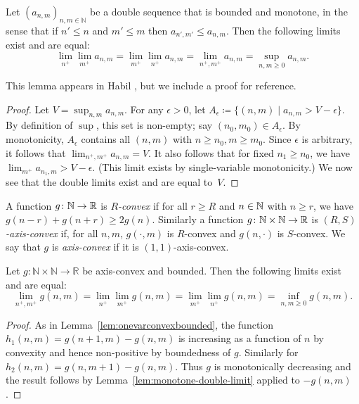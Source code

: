   \begin{lemma}\label{lem:monotone-double-limit}
  Let $(a_{n,m})_{n,m \in \mathbb{N}}$ be a double sequence that is
  bounded and monotone, in the sense that if $n' \leq n$ and
  $m' \leq m$ then
  $a_{n',m'} \leq a_{n,m}$. Then the following limits
  exist and are equal:
  \[
  \lim_{n^+}\lim_{m^+} a_{n,m} = \lim_{m^+}\lim_{n^+} a_{n,m} =
    \lim_{n^+, m^+} a_{n,m} = \sup_{n,m \ge 0} a_{n,m}.
  \]
  \end{lemma}
This lemma appears in Habil \cite[Thm.\ 4.2]{Hab16:DoubleSeq}, but we
include a proof for reference.

  \begin{proof}
    Let $V = \sup_{n,m} a_{n,m}$. For any $\epsilon > 0$, let
    $A_\epsilon \coloneqq \{(n,m) \mid a_{n,m} > V - \epsilon\}$. By
    definition of $\sup$, this set is non-empty; say $(n_0,m_0) \in
    A_\epsilon$. By monotonicity, $A_\epsilon$ contains all $(n,m)$
    with $n\ge n_0, m \ge m_0$. Since $\epsilon$ is arbitrary, it
    follows that $\lim_{n^+,m^+} a_{n,m} = V$. It also follows that
    for fixed $n_1 \ge n_0$, we have $\lim_{m^+} a_{n_1,m} >
    V-\epsilon$. (This limit
    exists by single-variable monotonicity.) We now see that the
    double limits exist and are equal to~$V$.
  \end{proof}

\begin{definition}
  A function $g \colon \mathbb{N} \to \mathbb{R}$ is \emph{$R$-convex} if for all
  $r \ge R$ and $n \in \mathbb{N}$ with $n \ge r$, we have
  $g(n-r) + g(n+r) \geq 2 g(n)$. Similarly a function
  $g \colon \mathbb{N} \times \mathbb{N} \to \mathbb{R}$ is
  \emph{$(R,S)$-axis-convex} if, for all $n,m$, $g(\cdot, m)$ is
  $R$-convex and $g(n, \cdot)$ is $S$-convex. We say that $g$ is
  \emph{axis-convex} if it is $(1,1)$-axis-convex.
\end{definition}
 
 \begin{lemma}
   Let $g \colon \mathbb{N} \times \mathbb{N} \to \mathbb{R}$ be axis-convex and bounded. Then the following limits exist and are equal:
   \[\lim_{n^+,m^+} g(n,m) = \lim_{n^+} \lim_{m^+} g(n,m)
     = \lim_{m^+} \lim_{n^+} g(n,m) = \inf_{n,m \ge 0} g(n,m).\]
 \end{lemma}
\begin{proof}
  As in Lemma~\ref{lem:onevarconvexbounded}, the function $h_1(n,m) =
  g(n+1,m) - g(n,m)$ is increasing as a function of $n$ by convexity
  and hence non-positive by boundedness of $g$. Similarly for
  $h_2(n,m) = g(n,m+1) - g(n,m)$. Thus $g$ is monotonically decreasing
  and the result follows by Lemma~\ref{lem:monotone-double-limit}
  applied to $-g(n,m)$.
\end{proof}


